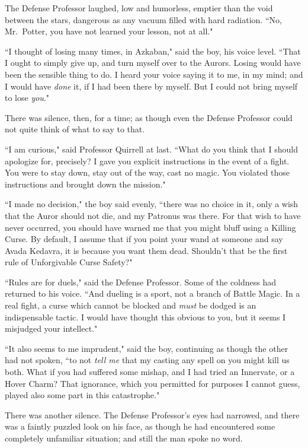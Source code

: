 The Defense Professor laughed, low and humorless, emptier than the void between the stars, dangerous as any vacuum filled with hard radiation. ``No, Mr.~Potter, you have not learned your lesson, not at all."

``I thought of losing many times, in Azkaban," said the boy, his voice level. ``That I ought to simply give up, and turn myself over to the Aurors. Losing would have been the sensible thing to do. I heard your voice saying it to me, in my mind; and I would have \emph{done} it, if I had been there by myself. But I could not bring myself to lose \emph{you}."

There was silence, then, for a time; as though even the Defense Professor could not quite think of what to say to that.

``I am curious," said Professor Quirrell at last. ``What do you think that I should apologize for, precisely? I gave you explicit instructions in the event of a fight. You were to stay down, stay out of the way, cast no magic. You violated those instructions and brought down the mission."

``I made no decision," the boy said evenly, ``there was no choice in it, only a wish that the Auror should not die, and my Patronus was there. For that wish to have never occurred, you should have warned me that you might bluff using a Killing Curse. By default, I assume that if you point your wand at someone and say Avada Kedavra, it is because you want them dead. Shouldn't that be the first rule of Unforgivable Curse Safety?"

``Rules are for duels," said the Defense Professor. Some of the coldness had returned to his voice. ``And dueling is a sport, not a branch of Battle Magic. In a real fight, a curse which cannot be blocked and \emph{must} be dodged is an indispensable tactic. I would have thought this obvious to you, but it seems I misjudged your intellect."

``It also seems to me imprudent," said the boy, continuing as though the other had not spoken, ``to not \emph{tell me} that my casting any spell on you might kill us both. What if you had suffered some mishap, and I had tried an Innervate, or a Hover Charm? That ignorance, which you permitted for purposes I cannot guess, played also some part in this catastrophe."

There was another silence. The Defense Professor's eyes had narrowed, and there was a faintly puzzled look on his face, as though he had encountered some completely unfamiliar situation; and still the man spoke no word.

